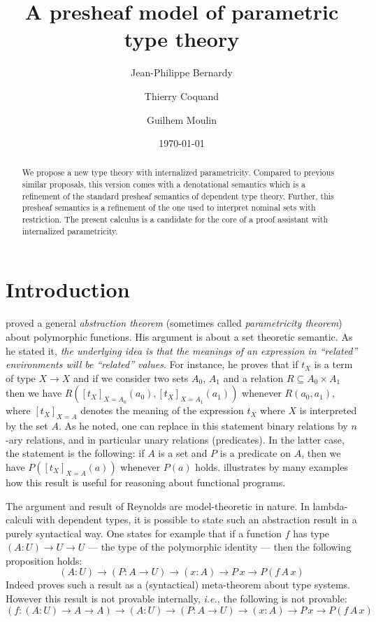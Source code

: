 \documentclass[english]{PaperTools/latex/lipics}
\title{A presheaf model of parametric type theory}
\author{Jean-Philippe Bernardy}
\author{Thierry Coquand}
\author{Guilhem Moulin}
\affil{Chalmers University of Technology and University of Gothenburg \\
\texttt{\{bernardy,coquand,mouling\}@chalmers.se}}
\date{\today}
\def\ie{\textit{i.e.}}
\begin{document}
\maketitle

\begin{abstract}
  We propose a new type theory with internalized
  parametricity. Compared to previous similar proposals, this version
  comes with a denotational semantics which is a refinement of the
  standard presheaf semantics of dependent type theory. Further, this
  presheaf semantics is a refinement of the one used to interpret
  nominal sets with restriction.  The present calculus is a candidate for the
  core of a proof assistant with internalized parametricity.
\end{abstract}

\section{Introduction}
\cite{reynolds_types_1983} proved a general \emph{abstraction theorem} (sometimes called
\emph{parametricity theorem}) about polymorphic functions. His argument is
about a set theoretic semantic.  As he stated it, {\em the underlying
  idea is that the meanings of an expression in ``related''
  environments will be ``related'' values}.  For instance, he proves
that if $t_X$ is a term of type $X → X$ and if we consider two sets
$A_0$, $A_1$ and a relation $R ⊆ A_0 × A_1$ then we have
$R([t_X]_{X=A_0}(a_0),[t_X]_{X=A_1}(a_1))$ whenever $R(a_0,a_1)$,
where $[t_X]_{X=A}$ denotes the meaning of the expression $t_X$ where
$X$ is interpreted by the set $A$. As he noted, one can replace in
this statement binary relations by $n$-ary relations, and in particular
unary relations (predicates). In the latter case, the statement is the following:
if $A$ is a set and $P$ is a predicate on $A$, then we have
$P([t_X]_{X=A}(a))$ whenever $P(a)$ holds.
\cite{wadler_theorems_1989} illustrates by many examples how this
result is useful for reasoning about functional programs.

The argument and result of Reynolds are model-theoretic in nature.
In lambda-calculi with dependent types, it is possible to state such an
abstraction result in a purely syntactical way.
One states for example that if a function $f$ has type
$(A : U) → U → U$ --- the type of the polymorphic identity --- then the
following proposition holds:
$$ (A : U) → (P : A → U) → (x : A) → P\, x → P (f\, A\, x) $$
%
Indeed \citet{bernardy_proofs_2012} proves such a result as a
(syntactical) meta-theorem about type systems. However this result is
not provable internally, \ie, the following is not provable:
$$ (f : (A:U) → A → A) →  (A : U) → (P : A → U) → (x : A) → P\, x → P (f\, A\, x) $$
\end{document}
